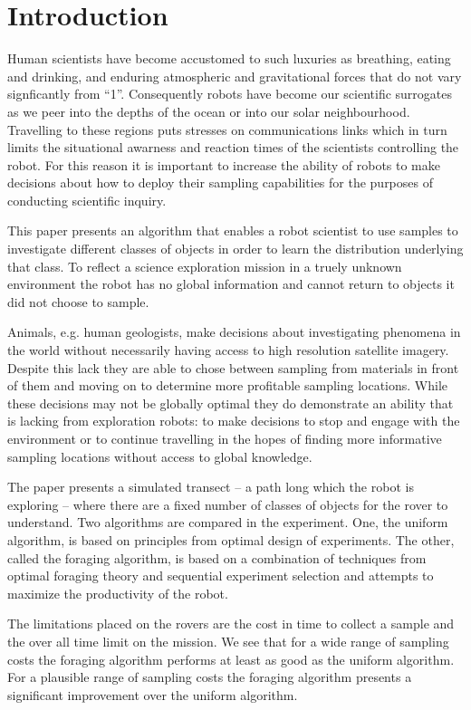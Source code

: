 \section{Introduction}
\label{sec:intro}

Human scientists have become accustomed to such luxuries as breathing, eating
and drinking, and enduring atmospheric and gravitational forces that do not
vary signficantly from ``1''.  Consequently robots have become our scientific
surrogates as we peer into the depths of the ocean or into our solar
neighbourhood.  Travelling to these regions puts stresses on communications
links which in turn limits the situational awarness and reaction times of the
scientists controlling the robot.  For this reason it is important to increase
the ability of robots to make decisions about how to deploy their sampling
capabilities for the purposes of conducting scientific inquiry.

This paper presents an algorithm that enables a robot scientist to use samples
to investigate different classes of objects in order to learn the distribution
underlying that class.  To reflect a science exploration mission in a truely unknown environment the robot has
no global information and cannot return to objects it did not choose to sample.

Animals, e.g. human geologists, make decisions about investigating phenomena in the world without necessarily having access to high resolution satellite imagery.  Despite this lack they are able to chose between sampling from materials in front of them and moving on to determine more profitable sampling locations.  While these decisions may not be globally optimal they do demonstrate an ability that is lacking from exploration robots: to make decisions to stop and engage with the environment or to continue travelling in the hopes of finding more informative sampling locations without access to global knowledge.

The paper presents a simulated transect -- a path long which the robot is exploring -- where there are a fixed number of classes of objects for the rover to understand.  Two algorithms are compared in the experiment.  One, the uniform algorithm, is based on principles from optimal design of experiments.  The other, called the foraging algorithm, is based on a combination of techniques from optimal foraging theory and sequential experiment selection and attempts to maximize the productivity of the robot.

The limitations placed on the rovers are the cost in time to collect a sample and the over all time limit on the mission.  We see that for a wide range of sampling costs the foraging algorithm performs at least as good as the uniform algorithm.  For a plausible range of sampling costs the foraging algorithm presents a significant improvement over the uniform algorithm.

